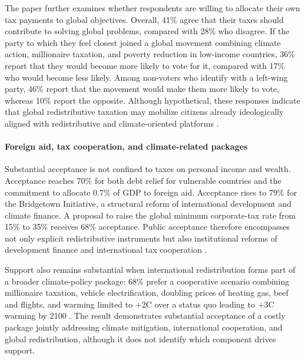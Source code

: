 \documentclass[11pt,a4paper]{article}
\begin{document}
The paper further examines whether respondents are willing to allocate their own tax payments to global objectives. Overall, 41\% agree that their taxes should contribute to solving global problems, compared with 28\% who disagree. %
If the party to which they feel closest joined a global movement combining climate action, millionaire taxation, and poverty reduction in low-income countries, 36\% report that they would become more likely to vote for it, compared with 17\% who would become less likely. Among non-voters who identify with a left-wing party, 46\% report that the movement would make them more likely to vote, whereas 10\% report the opposite. Although hypothetical, these responses indicate that global redistributive taxation may mobilize citizens already ideologically aligned with redistributive and climate-oriented platforms \citep{fabre_public_2026}.

\paragraph{Foreign aid, tax cooperation, and climate-related packages}
Substantial acceptance is not confined to taxes on personal income and wealth. Acceptance reaches 70\% for both debt relief for vulnerable countries and the %
commitment 
to allocate %
0.7\% of GDP %
to foreign aid. Acceptance rises to 79\% for the Bridgetown Initiative, %
a structural reform of international development and climate 
finance. A proposal to raise the global minimum corporate-tax rate from 15\% to 35\% receives 68\% acceptance. Public acceptance therefore encompasses not only explicit redistributive instruments but also institutional reforms of development finance and international tax cooperation \citep{fabre_public_2026}.

Support also remains substantial when international redistribution forms part of a broader climate-policy package: 68\% prefer a cooperative scenario combining millionaire taxation, vehicle electrification, doubling prices of heating gas, beef and flights, %
and warming limited to +2\textdegree{}C over a status quo leading to +3\textdegree{}C warming by 2100 \citep{fabre_public_2026}. The result demonstrates substantial acceptance of a costly package jointly addressing climate mitigation, international cooperation, and global redistribution, although it does not identify which component drives support.
\end{document}
